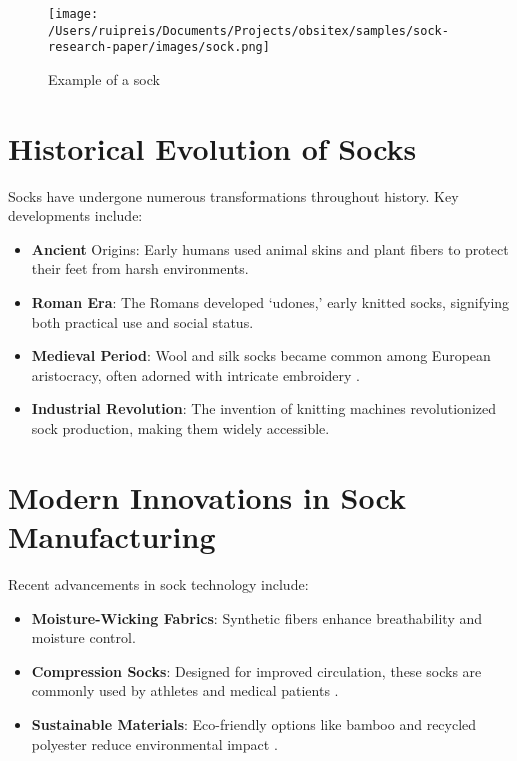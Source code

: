 \documentclass[runningheads]{llncs}
\begin{document}
\begin{figure}
\centering
\texttt{[image: /Users/ruipreis/Documents/Projects/obsitex/samples/sock-research-paper/images/sock.png]}
\caption{Example of a sock}
\label{fig:sock}
\end{figure}


\section{Historical Evolution of Socks}\label{sec:Historical_Evolution_of_Socks}



Socks have undergone numerous transformations throughout history. Key developments include:



\begin{itemize}
	\item \textbf{Ancient} Origins: Early humans used animal skins and plant fibers to protect their feet from harsh environments.
	\item \textbf{Roman Era}: The Romans developed ‘udones,’ early knitted socks, signifying both practical use and social status.
	\item \textbf{Medieval Period}: Wool and silk socks became common among European aristocracy, often adorned with intricate embroidery \citep{acharBackPainChildren2020}.
	\item \textbf{Industrial Revolution}: The invention of knitting machines revolutionized sock production, making them widely accessible.
\end{itemize}




\section{Modern Innovations in Sock Manufacturing}\label{sec:Modern_Innovations_in_Sock_Manufacturing}



Recent advancements in sock technology include:



\begin{itemize}
	\item \textbf{Moisture-Wicking Fabrics}: Synthetic fibers enhance breathability and moisture control.
	\item \textbf{Compression Socks}: Designed for improved circulation, these socks are commonly used by athletes and medical patients \citep{weiFinetunedLanguageModels2022,aghajanyanIntrinsicDimensionalityExplains2020}.
	\item \textbf{Sustainable Materials}: Eco-friendly options like bamboo and recycled polyester reduce environmental impact \citep{acharBackPainChildren2020}.
\end{itemize}
\end{document}
